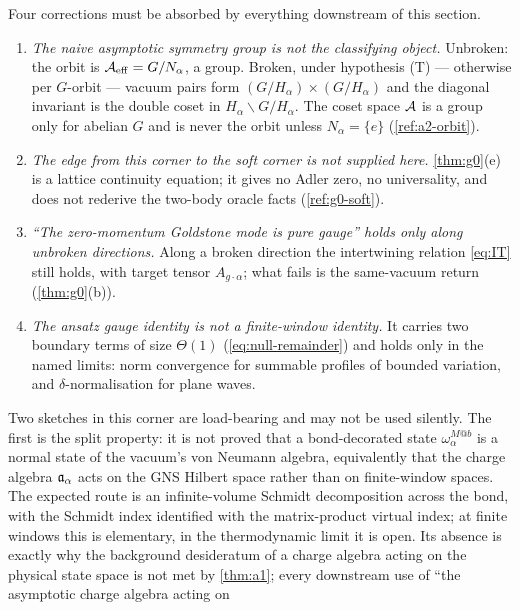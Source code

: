 \begin{scope}
\label{scope:corner-a-sketches}
Four corrections must be absorbed by everything downstream of this section.
\begin{enumerate}
\item[(i)] \emph{The naive asymptotic symmetry group is not the classifying
  object.}  Unbroken: the orbit is $\mathcal{A}_{\mathrm{eff}}=G/N_\alpha$, a group.  Broken, under
  hypothesis (T) --- otherwise per $G$-orbit --- vacuum pairs form
  $(G/H_\alpha)\times(G/H_\alpha)$ and the diagonal invariant is the double coset
  in $H_\alpha\backslash G/H_\alpha$.  The coset space $\mathcal{A}$ is a group only for
  abelian $G$ and is never the orbit unless $N_\alpha=\{e\}$
  (\cref{ref:a2-orbit}).
\item[(ii)] \emph{The edge from this corner to the soft corner is not supplied
  here.}  \cref{thm:g0}(e) is a lattice continuity equation; it gives no Adler
  zero, no universality, and does not rederive the two-body oracle facts
  (\cref{ref:g0-soft}).
\item[(iii)] \emph{``The zero-momentum Goldstone mode is pure gauge'' holds only
  along unbroken directions.}  Along a broken direction the intertwining relation
  \cref{eq:IT} still holds, with target tensor $A_{g\cdot\alpha}$; what fails is
  the same-vacuum return (\cref{thm:g0}(b)).
\item[(iv)] \emph{The ansatz gauge identity is not a finite-window identity.}  It
  carries two boundary terms of size $\Theta(1)$ (\cref{eq:null-remainder}) and
  holds only in the named limits: norm convergence for summable profiles of
  bounded variation, and $\delta$-normalisation for plane waves.
\end{enumerate}
Two sketches in this corner are load-bearing and may not be used silently.  The
first is the split property: it is not proved that a bond-decorated state
$\omega_\alpha^{M@b}$ is a normal state of the vacuum's von Neumann algebra,
equivalently that the charge algebra $\mathfrak{a}_\alpha$ acts on the GNS Hilbert space
rather than on finite-window spaces.  The expected route is an infinite-volume
Schmidt decomposition across the bond, with the Schmidt index identified with the
matrix-product virtual index; at finite windows this is elementary, in the
thermodynamic limit it is open.  Its absence is exactly why the background
desideratum of a charge algebra acting on the physical state space is not met by
\cref{thm:a1}; every downstream use of ``the asymptotic charge algebra acting on

\end{scope}
